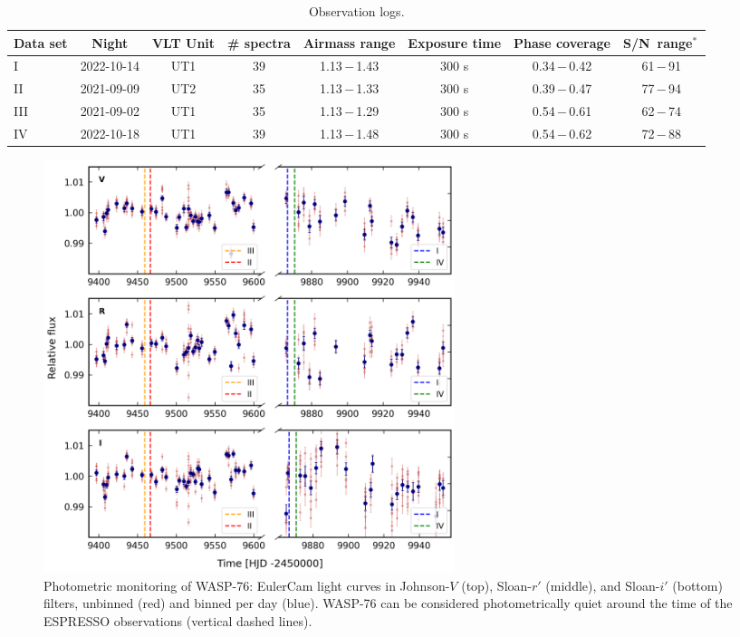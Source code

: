 \documentclass{aa}
\newcommand{\snr}{S/N}
\begin{document}
\begin{table}[h]
    \caption{Observation logs.}
    \label{tab:obs_log}
    \centering
    \begin{tabular}{lccccccc}
        \hline \hline
        Data set & Night & VLT Unit & \# spectra & Airmass range & Exposure time & Phase coverage & \snr\ range$^\ast\,$ \\
        \hline
        I   & 2022-10-14 & UT1 & 39 & 1.13\,$-$\,1.43 & 300 s & 0.34\,$-$\,0.42 & 61\,$-$\,91  \\
        II  & 2021-09-09 & UT2 & 35 & 1.13\,$-$\,1.33 & 300 s & 0.39\,$-$\,0.47 & 77\,$-$\,94  \\
        III & 2021-09-02 & UT1 & 35 & 1.13\,$-$\,1.29 & 300 s & 0.54\,$-$\,0.61 & 62\,$-$\,74  \\ 
        IV  & 2022-10-18 & UT1 & 39 & 1.13\,$-$\,1.48 & 300 s & 0.54\,$-$\,0.62 & 72\,$-$\,88  \\
        \hline
    \end{tabular}
\end{table}


\begin{figure}
\sidecaption
  \includegraphics[width=12cm]{phot_plots/v-r-i_lc.png}
     \caption{Photometric monitoring of WASP-76: EulerCam light curves in Johnson-$V$ (top), Sloan-$r'$ (middle), and Sloan-$i'$ (bottom) filters, unbinned (red) and binned per day (blue). WASP-76 can be considered photometrically quiet around the time of the ESPRESSO observations (vertical dashed lines).}
     \label{fig:multi-lcs}
\end{figure}
\end{document}
